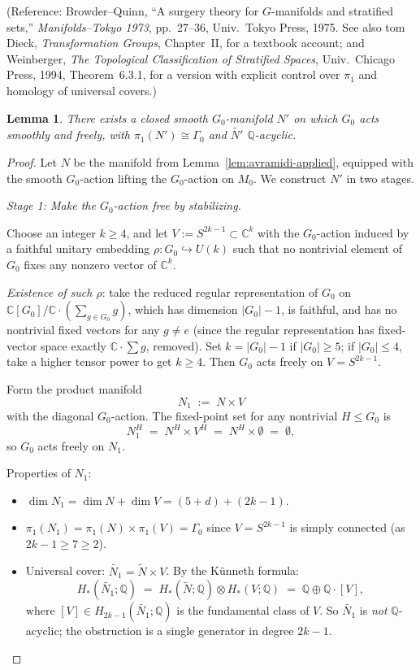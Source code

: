 \documentclass[12pt]{article}
\newtheorem{lemma}[theorem]{Lemma}
\theoremstyle{definition}
\begin{document}
(Reference: Browder--Quinn, ``A surgery theory for $G$-manifolds and stratified sets,'' \emph{Manifolds--Tokyo 1973}, pp.~27--36, Univ.\ Tokyo Press, 1975. See also tom Dieck, \emph{Transformation Groups}, Chapter~II, for a textbook account; and Weinberger, \emph{The Topological Classification of Stratified Spaces}, Univ.\ Chicago Press, 1994, Theorem~6.3.1, for a version with explicit control over $\pi_1$ and homology of universal covers.)

\begin{lemma}\label{lem:freeaction}
There exists a closed smooth $G_0$-manifold $N'$ on which $G_0$ acts smoothly and freely, with $\pi_1(N')\cong\Gamma_0$ and $\widetilde{N'}$ $\mathbb{Q}$-acyclic.
\end{lemma}

\begin{proof}
Let $N$ be the manifold from Lemma~\ref{lem:avramidi-applied}, equipped with the smooth $G_0$-action lifting the $G_0$-action on $M_0$. We construct $N'$ in two stages.

\medskip

\noindent\emph{Stage 1: Make the $G_0$-action free by stabilizing.}

Choose an integer $k\geq 4$, and let $V:=S^{2k-1}\subset\mathbb{C}^k$ with the $G_0$-action induced by a faithful unitary embedding $\rho:G_0\hookrightarrow U(k)$ such that no nontrivial element of $G_0$ fixes any nonzero vector of $\mathbb{C}^k$.

\emph{Existence of such $\rho$}: take the reduced regular representation of $G_0$ on $\mathbb{C}[G_0]/\mathbb{C}\cdot(\sum_{g\in G_0}g)$, which has dimension $|G_0|-1$, is faithful, and has no nontrivial fixed vectors for any $g\neq e$ (since the regular representation has fixed-vector space exactly $\mathbb{C}\cdot\sum g$, removed). Set $k=|G_0|-1$ if $|G_0|\geq 5$; if $|G_0|\leq 4$, take a higher tensor power to get $k\geq 4$. Then $G_0$ acts freely on $V=S^{2k-1}$.

Form the product manifold
\[
N_1 \;:=\; N\times V
\]
with the diagonal $G_0$-action. The fixed-point set for any nontrivial $H\leq G_0$ is
\[
N_1^H \;=\; N^H\times V^H \;=\; N^H\times\emptyset \;=\; \emptyset,
\]
so $G_0$ acts freely on $N_1$.

Properties of $N_1$:
\begin{itemize}[leftmargin=2em]
\item $\dim N_1=\dim N+\dim V=(5+d)+(2k-1)$.
\item $\pi_1(N_1)=\pi_1(N)\times\pi_1(V)=\Gamma_0$ since $V=S^{2k-1}$ is simply connected (as $2k-1\geq 7\geq 2$).
\item Universal cover: $\widetilde{N_1}=\widetilde{N}\times V$. By the K\"unneth formula:
\[
H_*(\widetilde{N_1};\mathbb{Q}) \;=\; H_*(\widetilde{N};\mathbb{Q})\otimes H_*(V;\mathbb{Q}) \;=\; \mathbb{Q}\oplus\mathbb{Q}\cdot[V],
\]
where $[V]\in H_{2k-1}(\widetilde{N_1};\mathbb{Q})$ is the fundamental class of $V$. So $\widetilde{N_1}$ is \emph{not} $\mathbb{Q}$-acyclic; the obstruction is a single generator in degree $2k-1$.
\end{itemize}


\end{proof}
\end{document}
